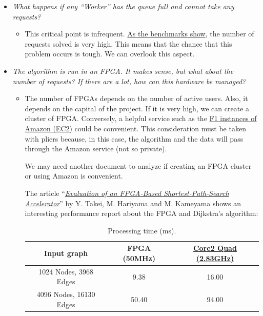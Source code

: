 \documentclass[a4paper]{article}
\newcommand{\dquotes}[1]{``#1''}
\begin{document}
    \begin{itemize}[label=]
        \item \emph{What happens if any \dquotes{Worker} has the queue full and cannot take any requests?}
        \begin{itemize}[label=]
            \item This critical point is infrequent. \href{https://www.nginx.com/blog/testing-the-performance-of-nginx-and-nginx-plus-web-servers/}{As the benchmarks show}, the number of requests solved is very high. This means that the chance that this problem occurs is tough. We can overlook this aspect.
        \end{itemize}

        \item \emph{The algorithm is run in an FPGA. It makes sense, but what about the number of requests? If there are a lot, how can this hardware be managed?}
        \begin{itemize}[label=]
            \item The number of FPGAs depends on the number of active users. Also, it depends on the capital of the project. If it is very high, we can create a cluster of FPGA. Conversely, a helpful service such as the \href{https://aws.amazon.com/ec2/instance-types/f1/}{F1 instances of Amazon (EC2)} could be convenient. This consideration must be taken with pliers because, in this case, the algorithm and the data will pass through the Amazon service (not so private).
            
            We may need another document to analyze if creating an FPGA cluster or using Amazon is convenient.

            The article \dquotes{\href{https://scholar.google.com/scholar?cluster=14234831352463010234&oi=gsb&hl=en&as_sdt=0,5}{\emph{Evaluation of an FPGA-Based Shortest-Path-Search Accelerator}}} by Y. Takei, M. Hariyama and M. Kameyama shows an interesting performance report about the FPGA and Dijkstra's algorithm:
            \begin{table}[!htp]
                \centering
                \begin{tabular}{@{} c c c @{}}
                    \toprule
                    Input graph & FPGA (50MHz) & \href{https://ark.intel.com/content/www/us/en/ark/products/33924/intel-core-2-quad-processor-q9550-12m-cache-2-83-ghz-1333-mhz-fsb.html}{Core2 Quad (2.83GHz)} \\
                    \midrule
                    1024 Nodes, 3968 Edges & 9.38 & 16.00 \\
                    4096 Nodes, 16130 Edges & 50.40 & 94.00 \\
                    \bottomrule
                \end{tabular}
                \caption{Processing time (ms).\cite{takei2015evaluation}}
            \end{table}       
        \end{itemize}


\end{itemize}
\end{document}
